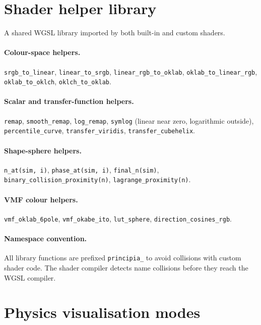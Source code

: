\documentclass[11pt]{report}
\begin{document}
\section{Shader helper library}
\label{sec:shader_helpers}

A shared WGSL library imported by both built-in and custom shaders.

\paragraph{Colour-space helpers.}
\texttt{srgb\_to\_linear}, \texttt{linear\_to\_srgb}, \texttt{linear\_rgb\_to\_oklab}, \texttt{oklab\_to\_linear\_rgb}, \texttt{oklab\_to\_oklch}, \texttt{oklch\_to\_oklab}.

\paragraph{Scalar and transfer-function helpers.}
\texttt{remap}, \texttt{smooth\_remap}, \texttt{log\_remap}, \texttt{symlog} (linear near zero, logarithmic outside), \texttt{percentile\_curve}, \texttt{transfer\_viridis}, \texttt{transfer\_cubehelix}.

\paragraph{Shape-sphere helpers.}
\texttt{n\_at(sim, i)}, \texttt{phase\_at(sim, i)}, \texttt{final\_n(sim)}, \texttt{binary\_collision\_proximity(n)}, \texttt{lagrange\_proximity(n)}.

\paragraph{VMF colour helpers.}
\texttt{vmf\_oklab\_6pole}, \texttt{vmf\_okabe\_ito}, \texttt{lut\_sphere}, \texttt{direction\_cosines\_rgb}.

\paragraph{Namespace convention.} All library functions are prefixed \texttt{principia\_} to avoid collisions with custom shader code. The shader compiler detects name collisions before they reach the WGSL compiler.

\section{Physics visualisation modes}
\label{sec:physics_vis}
\end{document}
